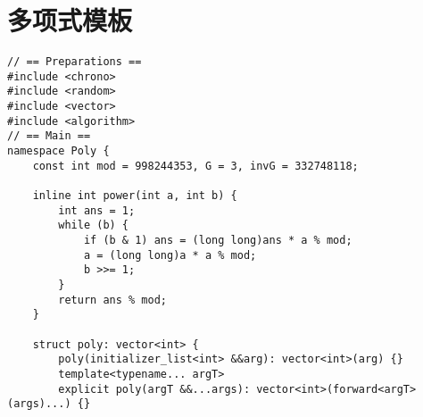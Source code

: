 \section{多项式模板}

\begin{verbatim}
// == Preparations ==
#include <chrono>
#include <random>
#include <vector>
#include <algorithm>
// == Main ==
namespace Poly {
    const int mod = 998244353, G = 3, invG = 332748118;

    inline int power(int a, int b) {
        int ans = 1;
        while (b) {
            if (b & 1) ans = (long long)ans * a % mod;
            a = (long long)a * a % mod;
            b >>= 1;
        }
        return ans % mod;
    }

    struct poly: vector<int> {
        poly(initializer_list<int> &&arg): vector<int>(arg) {}
        template<typename... argT>
        explicit poly(argT &&...args): vector<int>(forward<argT>(args)...) {}


\end{verbatim}
